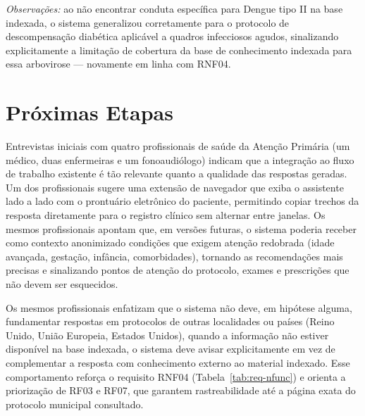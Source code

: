 \documentclass[conference,a4paper]{IEEEtran}
\begin{document}
\medskip
\noindent\textit{Observações:} ao não encontrar conduta
específica para Dengue tipo II na base indexada, o sistema
generalizou corretamente para o protocolo de descompensação
diabética aplicável a quadros infecciosos agudos, sinalizando
explicitamente a limitação de cobertura da base de conhecimento
indexada para essa arbovirose --- novamente em linha com RNF04.


\section{Próximas Etapas}
\label{sec:next}

Entrevistas iniciais com quatro profissionais de saúde da Atenção
Primária (um médico, duas enfermeiras e um fonoaudiólogo) indicam
que a integração ao fluxo de trabalho existente é tão relevante
quanto a qualidade das respostas geradas. Um dos profissionais
sugere uma extensão de navegador que exiba o assistente lado a
lado com o prontuário eletrônico do paciente, permitindo copiar
trechos da resposta diretamente para o registro clínico sem
alternar entre janelas. Os mesmos profissionais apontam que, em
versões futuras, o sistema poderia receber como contexto
anonimizado condições que exigem atenção redobrada (idade
avançada, gestação, infância, comorbidades), tornando as
recomendações mais precisas e sinalizando pontos de atenção do
protocolo, exames e prescrições que não devem ser esquecidos.

Os mesmos profissionais enfatizam que o sistema não deve, em
hipótese alguma, fundamentar respostas em protocolos de outras
localidades ou países (Reino Unido, União Europeia, Estados
Unidos), quando a informação não estiver disponível na base
indexada, o sistema deve avisar explicitamente em vez de
complementar a resposta com conhecimento externo ao material
indexado. Esse comportamento reforça o requisito RNF04
(Tabela~\ref{tab:req-nfunc}) e orienta a priorização de RF03 e
RF07, que garantem rastreabilidade até a página exata do
protocolo municipal consultado.



\end{document}

